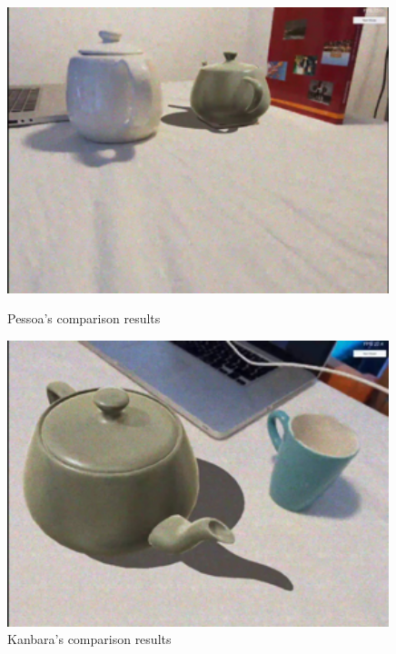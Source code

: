 \begin{figure}[H]
    \centering
    \begin{minipage}{0.475\textwidth}
        \centering
        \includegraphics[width=0.99\textwidth]{Figures/pessoaComp.png} %
        \caption{Pessoa's comparison results}
    \end{minipage}\hfill
    \begin{minipage}{0.475\textwidth}
        \centering
        \includegraphics[width=0.99\textwidth]{Figures/KanbaraComp.png} %
        \caption{Kanbara's comparison results}
    \end{minipage}\hfill
\end{figure}

